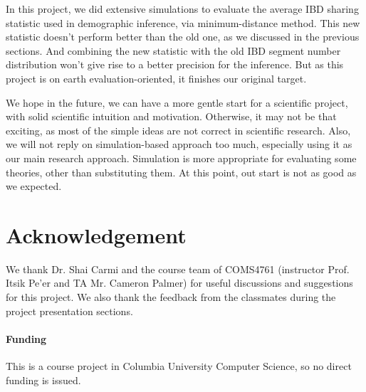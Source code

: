 \documentclass{bioinfo}
\begin{document}
In this project, we did extensive simulations to evaluate the average IBD sharing statistic used in demographic inference, via minimum-distance method. This new statistic doesn't perform better than the old one, as we discussed in the previous sections. And combining the new statistic with the old IBD segment number distribution won't give rise to a better precision for the inference. But as this project is on earth evaluation-oriented, it finishes our original target.

We hope in the future, we can have a more gentle start for a scientific project, with solid scientific intuition and motivation. Otherwise, it may not be that exciting, as most of the simple ideas are not correct in scientific research. Also, we will not reply on simulation-based approach too much, especially using it as our main research approach. Simulation is more appropriate for evaluating some theories, other than substituting them. At this point, out start is not as good as we expected.





\section*{Acknowledgement}
We thank Dr. Shai Carmi and the course team of COMS4761 (instructor Prof. Itsik Pe'er and TA Mr. Cameron Palmer) for useful discussions and suggestions for this project. We also thank the feedback from the classmates during the project presentation sections.

\paragraph{Funding\textcolon} This is a course project in Columbia University Computer Science, so no direct funding is issued.



%
%
%
%
%

\end{document}
